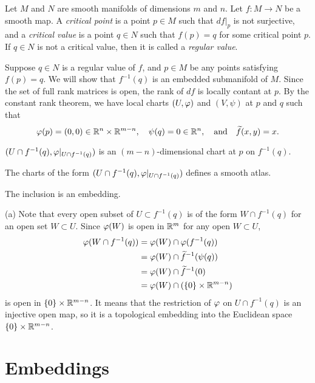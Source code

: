 \documentclass{../note}
\begin{document}
\begin{prb}
Let $M$ and $N$ are smooth manifolds of dimensions $m$ and $n$.
Let $f:M\to N$ be a smooth map.
A \emph{critical point} is a point $p\in M$ such that $df|_p$ is not surjective, and a \emph{critical value} is a point $q\in N$ such that $f(p)=q$ for some critical point $p$.
If $q\in N$ is not a critical value, then it is called a \emph{regular value}.

Suppose $q\in N$ is a regular value of $f$, and $p\in M$ be any points satisfying $f(p)=q$.
We will show that $f^{-1}(q)$ is an embedded submanifold of $M$.
Since the set of full rank matrices is open, the rank of $df$ is locally contant at $p$.
By the constant rank theorem, we have local charts $(U,\varphi)$ and $(V,\psi)$ at $p$ and $q$ such that
\[\varphi(p)=(0,0)\in\mathbb{R}^n\times\mathbb{R}^{m-n},\quad\psi(q)=0\in\mathbb{R}^n,\quad\text{and}\quad\widetilde f(x,y)=x.\]
\begin{parts}
\item $(U\cap f^{-1}(q),\varphi|_{U\cap f^{-1}(q)})$ is an $(m-n)$-dimensional chart at $p$ on $f^{-1}(q)$.
\item The charts of the form $(U\cap f^{-1}(q),\varphi|_{U\cap f^{-1}(q)})$ defines a smooth atlas.
\item The inclusion is an embedding.
\end{parts}
\end{prb}
\begin{pf}
(a)
Note that every open subset of $U\subset f^{-1}(q)$ is of the form $W\cap f^{-1}(q)$ for an open set $W\subset U$.
Since $\varphi(W)$ is open in $\mathbb{R}^m$ for any open $W\subset U$,
\begin{align*}
\varphi(W\cap f^{-1}(q))
&=\varphi(W)\cap\varphi(f^{-1}(q))\\
&=\varphi(W)\cap\widetilde f^{-1}(\psi(q))\\
&=\varphi(W)\cap\widetilde f^{-1}(0)\\
&=\varphi(W)\cap(\{0\}\times\mathbb{R}^{m-n})
\end{align*}
is open in $\{0\}\times\mathbb{R}^{m-n}$.
It means that the restriction of $\varphi$ on $U\cap f^{-1}(q)$ is an injective open map, so it is a topological embedding into the Euclidean space $\{0\}\times\mathbb{R}^{m-n}$.

\end{pf}


\section{Embeddings}
\end{document}
